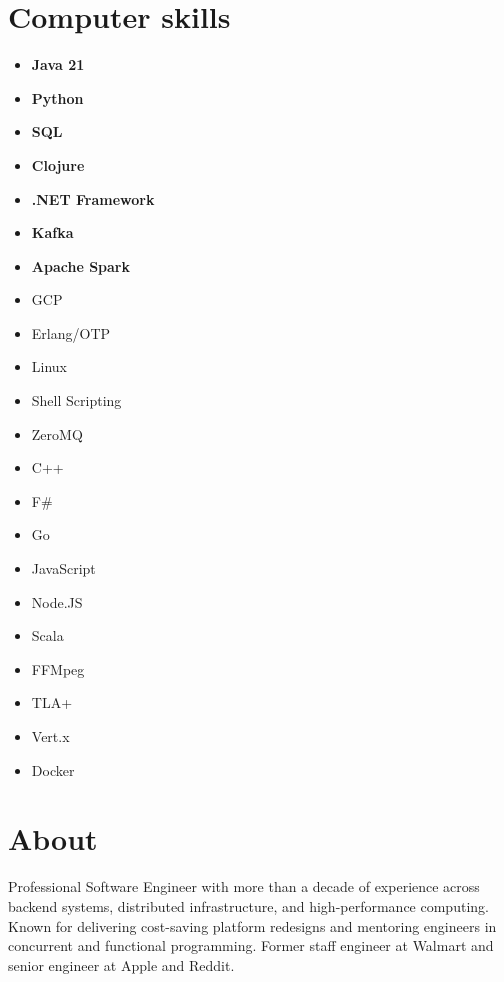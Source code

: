 \documentclass[11pt,a4paper,roman,english]{moderncv}        %
\begin{document}


\makecvtitle
\section{Computer skills}
\begin{multicols}{4}
	\begin{itemize}
		\item[] \textbf{Java 21}
		\item[] \textbf{Python}
		\item[] \textbf{SQL}
		\item[] \textbf{Clojure}
		\item[] \textbf{.NET Framework}
		\item[] \textbf{Kafka}
		\item[] \textbf{Apache Spark}
		\item[] GCP
		\item[] Erlang/OTP
		\item[] Linux
		\item[] Shell Scripting
		\item[] ZeroMQ
		\item[] C++
		\item[] F\#
		\item[] Go
		\item[] JavaScript
		\item[] Node.JS
		\item[] Scala
		\item[] FFMpeg
        \item[] TLA+
	\item[] Vert.x
        \item[] Docker
	\end{itemize}
\end{multicols}
\section{About}
Professional Software Engineer with more than a decade of experience across backend systems, distributed infrastructure, and high-performance computing. Known for delivering cost-saving platform redesigns and mentoring engineers in concurrent and functional programming. Former staff engineer at Walmart and senior engineer at Apple and Reddit.
\end{document}
